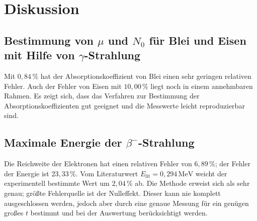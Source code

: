 \newpage
\section{Diskussion}
\label{sec:Diskussion}
\subsection{Bestimmung von \texorpdfstring{$\mu$}{Absorptionskoeffizient} und \texorpdfstring{$N_0$}{Anfangswert} für Blei und Eisen mit Hilfe von \texorpdfstring{$\gamma$}{Gamma}-Strahlung}
Mit $0,84\,\%$ hat der Absorptionskoeffizient von Blei einen sehr geringen relativen Fehler. Auch der Fehler von Eisen mit $10,00\,\%$ liegt noch in einem annehmbaren Rahmen. Es zeigt sich, dass das Verfahren zur Bestimmung der Absorptionskoeffizienten gut geeignet und die Messwerte leicht reproduzierbar sind.
\subsection{Maximale Energie der \texorpdfstring{$\beta^-$}{Beta}-Strahlung}
Die Reichweite der Elektronen hat einen relativen Fehler von $6,89\,\%$; der Fehler der Energie ist $23,33\,\%$. Vom Literaturwert $E_\mathup{lit}=0,294\,\si{\mega}\mathup{e}\si\volt$ weicht der experimentell bestimmte Wert um $2,04\,\%$ ab. Die Methode erweist sich als sehr genau; größte Fehlerquelle ist der Nulleffekt. Dieser kann nie komplett ausgeschlossen werden, jedoch aber durch eine genaue Messung für ein genügen großes $t$ bestimmt und bei der Auswertung berücksichtigt werden.
